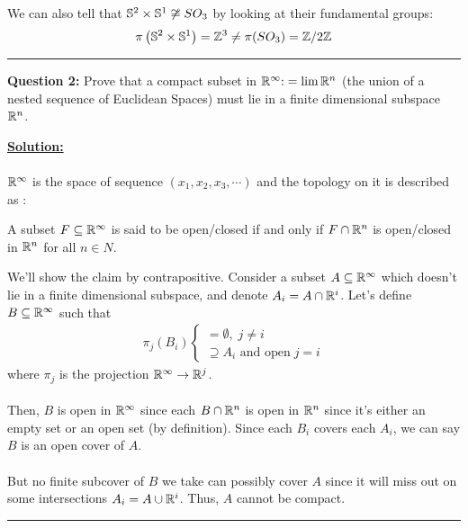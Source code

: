 \documentclass[11pt]{article}
\begin{document}
\begin{bluebox}
  We can also tell that $\mathbb{S}^2 \times \mathbb{S}^1 \not\cong SO_3$ by looking at their fundamental groups: 
\[ \pi\left(\mathbb{S}^2 \times \mathbb{S}^1\right) = \mathbb{Z}^3 \neq \pi(SO_3) = \mathbb{Z}/2\mathbb{Z} \]
\end{bluebox}


\vskip 0.5cm
\hrule
\pagebreak


\begin{bluebox}
  \textbf{Question 2:} Prove that a compact subset in $\mathbb{R}^{\infty} \text{:}= \lim \mathbb{R}^n$ (the union of a nested sequence of Euclidean Spaces) must lie in a finite dimensional subspace $\mathbb{R}^n$.
\end{bluebox}

\vskip 0.5cm
\textbf{\underline{Solution:}}
\\
\\
$\mathbb{R}^{\infty}$ is the space of sequence $(x_1, x_2, x_3, \cdots)$ and the topology on it is described as :
\begin{dottedbox}
  A subset $F \subseteq \mathbb{R}^{\infty}$ is said to be open/closed if and only if $F \cap \mathbb{R}^{n}$ is open/closed in $\mathbb{R}^n$ for all $n \in N$.
\end{dottedbox} We'll show the claim by contrapositive. Consider a subset $A \subseteq \mathbb{R}^{\infty}$ which doesn't lie in a finite dimensional subspace, and denote $A_i = A \cap \mathbb{R}^{i}$. Let's define $B \subseteq \mathbb{R}^{\infty}$ such that 
\begin{align*}
  \pi_j(B_i) \begin{cases}
    = \emptyset, \;j \neq i \\
    \supseteq A_i \text{ and open} \;j = i
  \end{cases}
\end{align*} where $\pi_j$ is the projection $\mathbb{R}^{\infty} \rightarrow \mathbb{R}^{j}$.
\\
\\
Then, $B$ is open in $\mathbb{R}^{\infty}$ since each $B \cap \mathbb{R}^{n}$ is open in $\mathbb{R}^n$ since it's either an empty set or an open set (by definition). Since each $B_i$ covers each $A_i$, we can say $B$ is an open cover of $A$. 
\\
\\
But no finite subcover of $B$ we take can possibly cover $A$ since it will miss out on some intersections $A_i = A \cup \mathbb{R}^{i}$. Thus, $A$ cannot be compact.

\vskip 0.5cm
\hrule
\pagebreak
\end{document}
